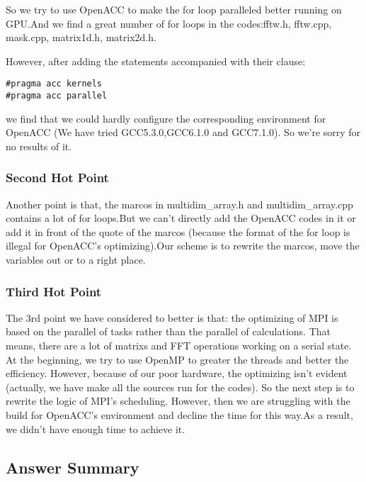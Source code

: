\documentclass{mcmthesis}
\begin{document}
\par So we try to use OpenACC to make the for loop paralleled better running on GPU.And we find a great number of for loops in the codes:fftw.h, fftw.cpp, mask.cpp, matrix1d.h, matrix2d.h. 

\par However, after adding the statements accompanied with their clause:

\begin{lstlisting}
#pragma acc kernels 
#pragma acc parallel 
\end{lstlisting}

\par we find that we could hardly configure the corresponding environment for OpenACC (We have tried GCC5.3.0,GCC6.1.0 and GCC7.1.0). So we're sorry for no results of it.

\subsubsection{Second Hot Point}

\par Another point is that, the marcos in multidim\_array.h and multidim\_array.cpp contains a lot of for loops.But we can't directly add the OpenACC codes in it or add it in front of the quote of the marcos (because the format of the for loop is illegal for OpenACC's optimizing).Our scheme is to rewrite the marcos, move the variables out or to a right place.

\subsubsection{Third Hot Point}

\par The 3rd point we have considered to better is that: the optimizing of MPI is based on the parallel of tasks rather than the parallel of calculations. That means, there are a lot of matrixs and FFT operations working on a serial state. At the beginning, we try to use OpenMP to greater the threads and better the efficiency. However, because of our poor hardware, the optimizing isn't evident (actually, we have make all the sources run for the codes). So the next step is to rewrite the logic of MPI's scheduling. However, then we are struggling with the build for OpenACC's environment and decline the time for this way.As a result, we didn't have enough time to achieve it.


\subsection{Answer Summary}
\end{document}
